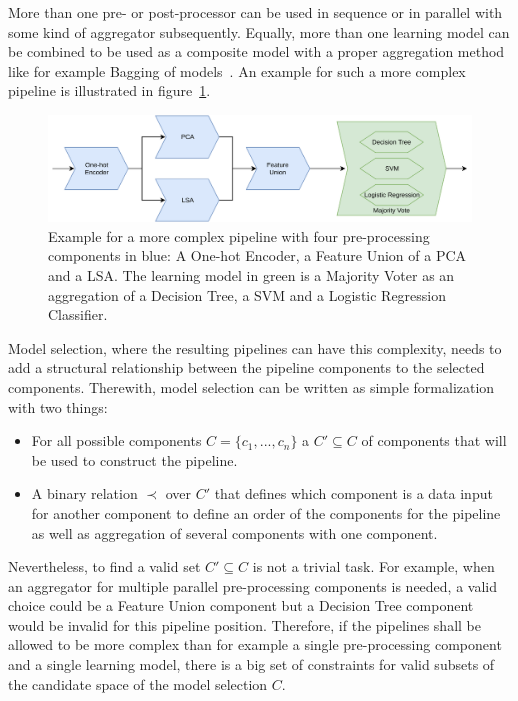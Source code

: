 More than one pre- or post-processor can be used in sequence or in parallel with some kind of aggregator subsequently.
Equally, more than one learning model can be combined to be used as a composite model with a proper aggregation method like for example Bagging of models~\cite{Breiman-BaggingPredictors}.
An example for such a more complex pipeline is illustrated in figure~\ref{fig:theory:complexPipeline}.\newline
\begin{figure}[ht!]
    \centering
    \includegraphics[width=\textwidth]{gfx/Figures/Theory/ComplexPipeline.pdf}
    \caption{Example for a more complex pipeline with four pre-processing components in blue: A One-hot Encoder, a Feature Union of a PCA and a LSA. The learning model in green is a Majority Voter as an aggregation of a Decision Tree, a SVM and a Logistic Regression Classifier. }
	\label{fig:theory:complexPipeline}
\end{figure}
Model selection, where the resulting pipelines can have this complexity, needs to add a structural relationship between the pipeline components to the selected components.
Therewith, model selection can be written as simple formalization with two things:
\begin{itemize}
    \item For all possible components $C=\{c_1, ..., c_n\}$ a $C' \subseteq C$ of components that will be used to construct the pipeline.
    \item A binary relation $\prec$ over $C'$ that defines which component is a data input for another component to define an order of the components for the pipeline as well as aggregation of several components with one component. 
\end{itemize}
Nevertheless, to find a valid set $C' \subseteq C$ is not a trivial task.
For example, when an aggregator for multiple parallel pre-processing components is needed, a valid choice could be a Feature Union component but a Decision Tree component would be invalid for this pipeline position.
Therefore, if the pipelines shall be allowed to be more complex than for example a single pre-processing component and a single learning model, there is a big set of constraints for valid subsets of the candidate space of the model selection $C$.

